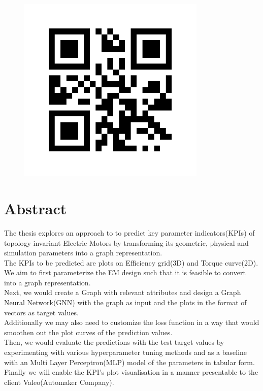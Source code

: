 \documentclass[a4paper,12pt]{article}
\begin{document}
\begin{figure}[h]
    \includegraphics[width=0.8\textwidth]{./ReportImages/qrcode.png} %
    \label{fig:your-image}
\end{figure}

\newpage %

\section*{Abstract}
The thesis explores an approach to  to predict key parameter indicators(KPIs) of topology invariant Electric Motors by transforming its geometric, physical and simulation parameters into a graph representation. \\
The KPIs to be predicted are plots on Efficiency grid(3D) and Torque curve(2D).\\
We aim to first parameterize the EM design such that it is feasible to convert into a graph representation. \\
Next, we would create a Graph with relevant attributes and design a Graph Neural Network(GNN) with the graph as input and the plots in the format of vectors as target values.\\
Additionally we may also need to customize the loss function in a way that would smoothen out the plot curves of the prediction values.\\
Then, we would evaluate the predictions with the test target values by experimenting with various hyperparameter tuning methods and as a baseline with an Multi Layer Perceptron(MLP) model of the parameters in tabular form.\\
Finally we will enable the KPI's plot visualisation in a manner presentable to the client Valeo(Automaker Company).\\
\end{document}
